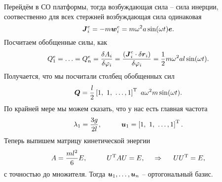 Перейдём в СО платформы, тогда возбуждающая сила -- сила инерции, соотвественно для всех стержней возбуждающая сила одинаковая
\begin{equation*}
    \mbox{\boldmath $J$}_i^e
    = - m \mathrm{\mbox{\boldmath $w$}}_i^e = m \omega^2 a \sin (\omega t) \mbox{\boldmath $e$}.
\end{equation*}
Посчитаем обобщенные силы, как
\begin{equation*}
    Q_1^e = \ldots = Q_n^e = \frac{\delta A_i}{\delta \varphi_i} = 
    \frac{
    \left(
        \mbox{\boldmath $J$}_i^e \cdot \delta \mbox{\boldmath $r$}_i
    \right)
    }{
        \delta \varphi_i
    } = \frac{1}{2} m \omega^2 a l \sin (\omega t).
\end{equation*}
Получается, что мы посчитали столбец обобщенных сил
\begin{equation*}
    \mbox{\boldmath $Q$} = \frac{l}{2} \left[
        1, \ 1,\  \ldots, 1
    \right]^{\text{T}} \ a \omega^2 m \sin (\omega t).
\end{equation*}
По крайней мере мы можем сказать, что у нас есть главная частота
\begin{equation*}
    \lambda_1 = \frac{3 g}{2l}, \hspace{1 cm}
    \mbox{\boldmath $u$}_1 = \left[
        1, \ 1,\  \ldots, 1
    \right]^{\text{T}}.
\end{equation*}
Теперь выпишем матрицу кинетической энергии
\begin{equation*}
    A = \frac{ml^2}{6} E, \hspace{1 cm} U^{\text{T}} A U = E,
    \hspace{0.5cm} \Rightarrow \hspace{0.5cm}
    U U^{\text{T}} = E,
\end{equation*}
с точностью до множителя. Тогда $\mbox{\boldmath $u$}_1, \ldots, \mbox{\boldmath $u$}_n$ -- ортогональный базис.

